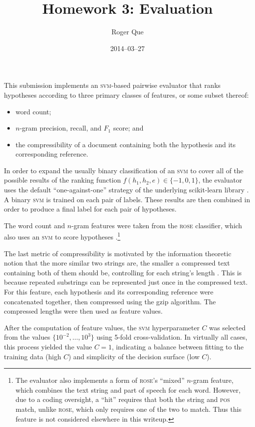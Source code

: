 \documentclass[11pt,twocolumn]{article}
\begin{document}
\title{Homework 3: Evaluation}
\author{Roger Que}
\date{2014--03--27}
\maketitle

This submission implements an \textsc{svm}-based pairwise evaluator that
ranks hypotheses according to three primary classes of features, or some
subset thereof:
\begin{itemize}[noitemsep]
\item  word count;
\item  $n$-gram precision, recall, and $F_1$ score; and
\item  the compressibility of a document containing both the hypothesis
       and its corresponding reference.
\end{itemize}
In order to expand the usually binary classification of an \textsc{svm}
to cover all of the possible results of the ranking function
$f(h_1,h_2,e)\in\{-1,0,1\}$, the evaluator uses the default
``one-against-one'' strategy of the underlying scikit-learn library
\cite{scikit-learn}.
A binary \textsc{svm} is trained on each pair of labels.
These results are then combined in order to produce a final label for
each pair of hypotheses.

The word count and $n$-gram features were taken from the \textsc{rose}
classifier, which also uses an \textsc{svm} to score hypotheses
\cite{Song:2011}.\footnote{
    The evaluator also implements a form of \textsc{rose}'s ``mixed''
    $n$-gram feature, which combines the text string and part of speech
    for each word.
    However, due to a coding oversight, a ``hit'' requires that both
    the string and \textsc{pos} match, unlike \textsc{rose}, which only
    requires one of the two to match.
    Thus this feature is not considered elsewhere in this writeup.
}

The last metric of compressibility is motivated by the information
theoretic notion that the more similar two strings are, the smaller a
compressed text containing both of them should be, controlling for each
string's length \cite{Dobrinkat:2010}.
This is because repeated substrings can be represented just once in
the compressed text.
For this feature, each hypothesis and its corresponding reference were
concatenated together, then compressed using the gzip algorithm.
The compressed lengths were then used as feature values.

After the computation of feature values, the \textsc{svm} hyperparameter
$C$ was selected from the values $\{10^{-2},\ldots,10^3\}$ using 5-fold
cross-validation.
In virtually all cases, this process yielded the value $C=1$, indicating
a balance between fitting to the training data (high $C$) and simplicity
of the decision surface (low $C$).
\end{document}
